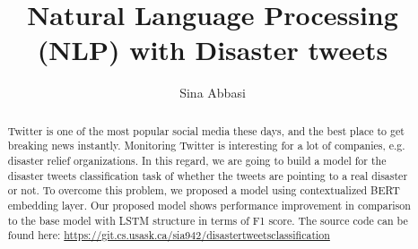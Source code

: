 \documentclass[sigconf]{acmart}
\begin{document}
\title{Natural Language Processing (NLP) with Disaster tweets}



\author{Sina Abbasi}


\begin{abstract}


Twitter is one of the most popular social media these days, and the best place to get breaking news instantly. Monitoring Twitter is interesting for a lot of companies, e.g. disaster relief organizations. In this regard, we are going to build a model for the disaster tweets classification task of whether the tweets are pointing to a real disaster or not. To overcome this problem, we proposed a model using contextualized BERT embedding layer. Our proposed model shows performance improvement in comparison to the base model with LSTM structure in terms of F1 score. The source code can be found here: \url{https://git.cs.usask.ca/sia942/disastertweetsclassification}

\end{abstract}

\end{document}
